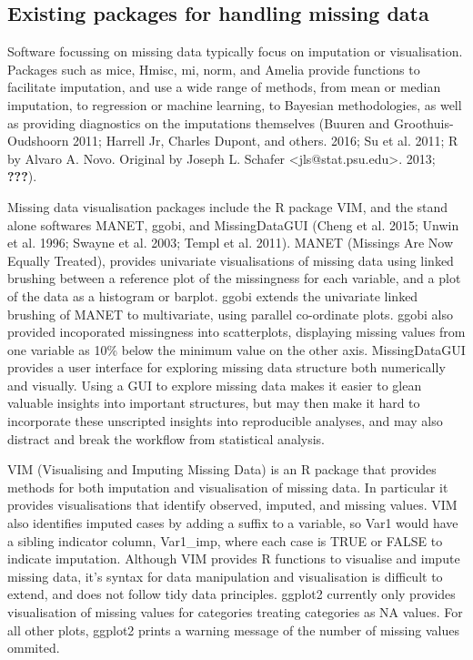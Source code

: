 \documentclass[]{article}
\begin{document}
\subsection{Existing packages for handling missing
data}\label{existing-packages-for-handling-missing-data}

Software focussing on missing data typically focus on imputation or
visualisation. Packages such as mice, Hmisc, mi, norm, and Amelia
provide functions to facilitate imputation, and use a wide range of
methods, from mean or median imputation, to regression or machine
learning, to Bayesian methodologies, as well as providing diagnostics on
the imputations themselves (Buuren and Groothuis-Oudshoorn 2011; Harrell
Jr, Charles Dupont, and others. 2016; Su et al. 2011; R by Alvaro A.
Novo. Original by Joseph L. Schafer
\textless{}jls@stat.psu.edu\textgreater{}. 2013; {\textbf{???}}).

Missing data visualisation packages include the R package VIM, and the
stand alone softwares MANET, ggobi, and MissingDataGUI (Cheng et al.
2015; Unwin et al. 1996; Swayne et al. 2003; Templ et al. 2011). MANET
(Missings Are Now Equally Treated), provides univariate visualisations
of missing data using linked brushing between a reference plot of the
missingness for each variable, and a plot of the data as a histogram or
barplot. ggobi extends the univariate linked brushing of MANET to
multivariate, using parallel co-ordinate plots. ggobi also provided
incoporated missingness into scatterplots, displaying missing values
from one variable as 10\% below the minimum value on the other axis.
MissingDataGUI provides a user interface for exploring missing data
structure both numerically and visually. Using a GUI to explore missing
data makes it easier to glean valuable insights into important
structures, but may then make it hard to incorporate these unscripted
insights into reproducible analyses, and may also distract and break the
workflow from statistical analysis.

VIM (Visualising and Imputing Missing Data) is an R package that
provides methods for both imputation and visualisation of missing data.
In particular it provides visualisations that identify observed,
imputed, and missing values. VIM also identifies imputed cases by adding
a suffix to a variable, so Var1 would have a sibling indicator column,
Var1\_imp, where each case is TRUE or FALSE to indicate imputation.
Although VIM provides R functions to visualise and impute missing data,
it's syntax for data manipulation and visualisation is difficult to
extend, and does not follow tidy data principles. ggplot2 currently only
provides visualisation of missing values for categories treating
categories as NA values. For all other plots, ggplot2 prints a warning
message of the number of missing values ommited.
\end{document}
